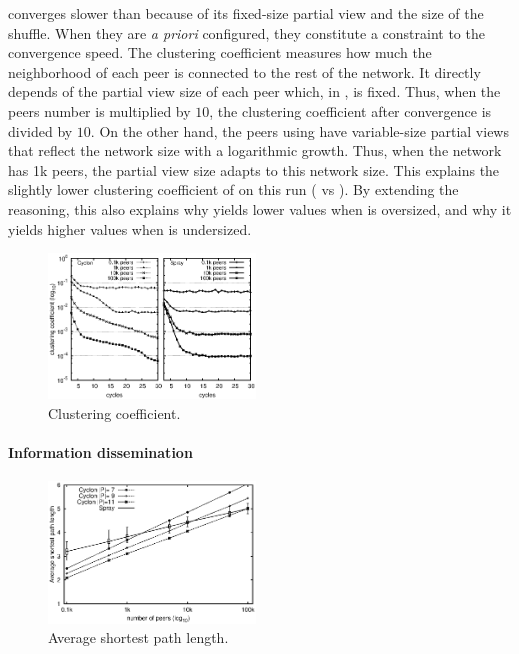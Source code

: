 \begin{asparadesc}
  converges slower than \SPRAY because of its fixed-size partial view and the
  size of the shuffle. When they are \emph{a priori} configured, they constitute
  a constraint to the convergence speed.  The clustering coefficient measures
  how much the neighborhood of each peer is connected to the rest of the
  network. It directly depends of the partial view size of each peer which, in
  \CYCLON, is fixed. Thus, when the peers number is multiplied by $10$, the
  clustering coefficient after convergence is divided by $10$. On the other
  hand, the peers using \SPRAY have variable-size partial views that reflect the
  network size with a logarithmic growth. Thus, when the network has 1k peers,
  the partial view size adapts to this network size. This explains the slightly
  lower clustering coefficient of \SPRAY on this run ( vs ). By extending the reasoning, this also explains why \SPRAY yields lower
  values when \CYCLON is oversized, and why it yields higher values when \CYCLON
  is undersized.
\end{asparadesc}

\begin{figure}
  \centering
  \includegraphics[width=0.49\textwidth]{img/simple.eps}
  \caption{\label{fig:clustering}Clustering coefficient.}
\end{figure}


\vspace{-7pt}
\paragraph{Information dissemination}

\begin{figure}
  \centering
  \includegraphics[width=0.49\textwidth]{img/avgpath.eps}
  \caption{\label{fig:avgpath}Average shortest path length.}
\end{figure}

